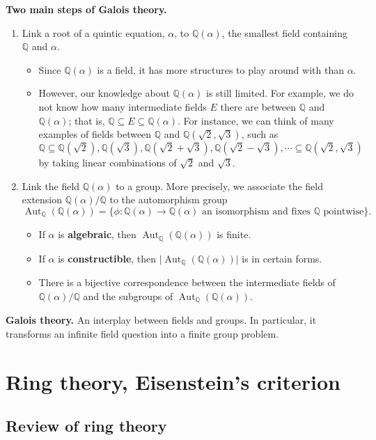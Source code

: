 \documentclass[10pt]{article}
\newcommand{\Q}{\mathbb{Q}}
\DeclareMathOperator{\Aut}{Aut}
\theoremstyle{newstyle}
\begin{document}
{\bf Two main steps of Galois theory.}
\begin{enumerate}[(1)]
    \item Link a root of a quintic equation, $\alpha$, to $\Q(\alpha)$, the smallest field 
    containing $\Q$ and $\alpha$.
    \begin{itemize}
        \item Since $\Q(\alpha)$ is a field, it has more structures to play around with than $\alpha$.
        \item However, our knowledge about $\Q(\alpha)$ is still limited. For example, we do not 
        know how many intermediate fields $E$ there are between $\Q$ and $\Q(\alpha)$; that is, 
        $\Q \subseteq E \subseteq \Q(\alpha)$. For instance, we can think of many 
        examples of fields between $\Q$ and $\Q(\sqrt2, \sqrt3)$, such as 
        \[ \Q \subseteq \Q(\sqrt2), \Q(\sqrt3), \Q(\sqrt2+\sqrt3), \Q(\sqrt2-\sqrt3), \cdots 
        \subseteq \Q(\sqrt2, \sqrt3) \]
        by taking linear combinations of $\sqrt2$ and $\sqrt3$.
    \end{itemize}
    \item Link the field $\Q(\alpha)$ to a group. More precisely, we associate the field extension 
    $\Q(\alpha)/\Q$ to the automorphism group 
    \[ \Aut_{\Q}(\Q(\alpha)) = \{\phi : \Q(\alpha) \to \Q(\alpha) \text{ an isomorphism and fixes 
    $\Q$ pointwise}\}. \]
    \begin{itemize}
        \item If $\alpha$ is {\bf algebraic}, then $\Aut_{\Q}(\Q(\alpha))$ is finite. 
        \item If $\alpha$ is {\bf constructible}, then $\lvert\Aut_{\Q}(\Q(\alpha))\rvert$ is in certain
        forms.
        \item There is a bijective correspondence between the intermediate fields of 
        $\Q(\alpha)/\Q$ and the subgroups of $\Aut_{\Q}(\Q(\alpha))$.
    \end{itemize}
\end{enumerate}

{\bf Galois theory.} An interplay between fields and groups. In particular, it transforms an infinite 
field question into a finite group problem.

\section{Ring theory, Eisenstein's criterion}

\subsection{Review of ring theory}
\end{document}
